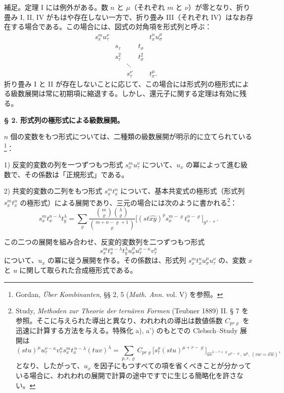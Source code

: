 \documentclass[11pt]{jlreq}
\begin{document}
補足。定理 I には例外がある。数 $n$ と $\mu$（それぞれ $m$ と $\nu$）が零となり、折り畳み I, II, IV がもはや存在しない一方で、折り畳み III（それぞれ IV）はなお存在する場合である。この場合には、図式の対角項を形式列と呼ぶ：
\[
\begin{array}{ccccc}
s_x^m u_\tau^\nu &&&& t_x^n u_\sigma^\mu\\
& s_\tau && t_\sigma &\\
& s_\tau^2 && t_\sigma^2 &\\
&&\ddots&&\\
&&s_\tau^\nu && t_\sigma^\mu .
\end{array}
\]
折り畳み I と II が存在しないことに応じて、この場合には形式列の極形式による級数展開は常に初期項に縮退する。しかし、還元子に関する定理は有効に残る。

\begin{center}
\textbf{§ 2. \quad 形式列の極形式による級数展開。}
\end{center}

$n$ 個の変数をもつ形式については、二種類の級数展開が明示的に立てられている\footnote{Gordan, \emph{Über Kombinanten}, §§ 2, 5 (\emph{Math. Ann.} vol. V) を参照。}：

1) 反変的変数の列を一つずつもつ形式 $s_x^m u_\tau^\nu$ について、$u_x$ の冪によって進む級数で、その係数は「正規形式」である。

2) 共変的変数の二列をもつ形式 $s_x^m t_x^n$ について、基本共変式の極形式（形式列 $s_x^m t_x^n$ の極形式）による展開であり、三元の場合には次のように書かれる\footnote{Study, \emph{Methoden zur Theorie der ternären Formen} (Teubner 1889) II. § 7 を参照。そこに与えられた導出と異なり、われわれの導出は数値係数 $C_{pr\varrho}$ を迅速に計算する方法を与える。特殊化 a), a') のもとでの Clebsch--Study 展開は
\[
(stu)^\mu u_\tau^{\nu-\kappa}v_\tau^\kappa s_x^m t_x^{\,n-\lambda}(tuv)^\lambda
=\sum_{p,r,\varrho} C_{pr\varrho}
\bigl[s_\tau^\varrho(stu)^{\mu+r-\varrho}\bigr]_{\widehat{uv}^{\lambda-r+\varrho}v^{\nu-\varrho},\,u^p,\,(vw=\widehat{xw})},
\]
となり、したがって、$u_x$ を因子にもつすべての項を省くべきことが分かっている場合に、われわれの展開で計算の途中ですでに生じる簡略化を許さない。}：
\[
\tag{I}
s_x^m t_x^{n-\lambda}t_y^\lambda
=\sum_{\varrho}
\frac{\binom{m}{\varrho}\binom{\lambda}{\varrho}}
{\binom{m+n-\varrho+1}{\varrho}}
\bigl[(st\widehat{xy})^\varrho s_x^{m-\varrho}t_x^{n-\varrho}\bigr]_{y^{\lambda-\varrho}}.
\]

この二つの展開を組み合わせ、反変的変数列を二つずつもつ形式
\[
s_x^m t_x^{n-\lambda}t_y^\lambda u_\sigma^\mu u_\tau^{\nu-\kappa}v_\tau^\kappa
\]
について、$u_x$ の冪に従う展開を作る。その係数は、形式列 $s_x^m t_x^n u_\sigma^\mu u_\tau^\nu$ の、変数 $x$ と $u$ に関して取られた合成極形式である。
\end{document}
